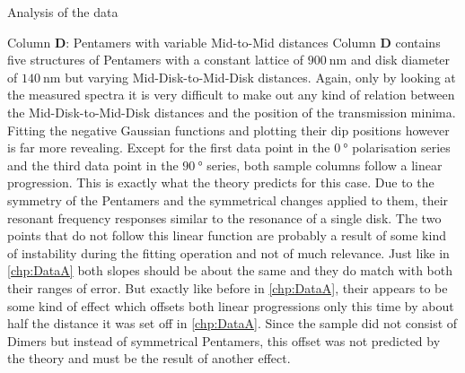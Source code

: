 \documentclass[pdftex, a4paper,11pt, twoside, UKenglish]{report}
\begin{document}
\begin{chapter}{Analysis of the data}
    \newpage
    \begin{section}{Column \textbf{D}: Pentamers with variable Mid-to-Mid
        distances}
      \label{chp:DataD}
      Column \textbf{D} contains five structures of Pentamers with a constant
      lattice of $\SI{900}{\nano\meter}$ and disk diameter of
      $\SI{140}{\nano\meter}$ but varying Mid-Disk-to-Mid-Disk distances.
      Again, only by looking at the measured spectra it is very difficult to
      make out any kind of relation between the Mid-Disk-to-Mid-Disk distances
      and the position of the transmission minima. Fitting the negative Gaussian
      functions and plotting their dip positions however is far more revealing.
      Except for the first data point in the $\SI{0}{\degree}$ polarisation
      series and the third data point in the $\SI{90}{\degree}$ series, both
      sample columns follow a linear progression. This is exactly what the
      theory predicts for this case. Due to the symmetry of the Pentamers and
      the symmetrical changes applied to them, their resonant frequency
      responses similar to the resonance of a single disk. \newline
      The two points that do not follow this linear function are probably a
      result of some kind of instability during the fitting operation and not
      of much relevance.\newline
      Just like in \cref{chp:DataA} both slopes should be about the same and
      they do match with both their ranges of error. But exactly like before in
      \cref{chp:DataA}, their appears to be some kind of effect which offsets
      both linear progressions only this time by about half the distance it
      was set off in \cref{chp:DataA}. Since the sample did not consist of
      Dimers but instead of symmetrical Pentamers, this offset was not predicted
      by the theory and must be the result of another effect.
      

\end{section}
\end{chapter}
\end{document}
